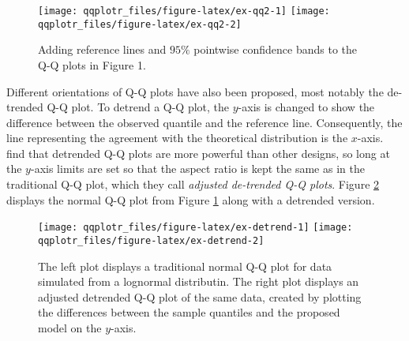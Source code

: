 \begin{Schunk}
\begin{figure}

{\centering \texttt{[image: qqplotr\_files/figure-latex/ex-qq2-1]} \texttt{[image: qqplotr\_files/figure-latex/ex-qq2-2]} 

}

\caption[Adding reference lines and $95\%$ pointwise confidence bands to the Q-Q plots in Figure 1]{Adding reference lines and $95\%$ pointwise confidence bands to the Q-Q plots in Figure 1.}\label{fig:ex-qq2}
\end{figure}
\end{Schunk}

Different orientations of Q-Q plots have also been proposed, most
notably the de-trended Q-Q plot. To detrend a Q-Q plot, the \(y\)-axis
is changed to show the difference between the observed quantile and the
reference line. Consequently, the line representing the agreement with
the theoretical distribution is the \(x\)-axis. \citet{Loy2016-fg} find
that detrended Q-Q plots are more powerful than other designs, so long
at the \(y\)-axis limits are set so that the aspect ratio is kept the
same as in the traditional Q-Q plot, which they call \emph{adjusted
de-trended Q-Q plots}. Figure \ref{fig:ex-detrend} displays the normal
Q-Q plot from Figure \ref{fig:ex-qq2} along with a detrended version.

\begin{Schunk}
\begin{figure}

{\centering \texttt{[image: qqplotr\_files/figure-latex/ex-detrend-1]} \texttt{[image: qqplotr\_files/figure-latex/ex-detrend-2]} 

}

\caption[The left plot displays a traditional normal Q-Q plot for data simulated from a lognormal distributin]{The left plot displays a traditional normal Q-Q plot for data simulated from a lognormal distributin. The right plot displays an adjusted detrended Q-Q plot of the same data, created by plotting the differences between the sample quantiles and the proposed model on the $y$-axis.}\label{fig:ex-detrend}
\end{figure}
\end{Schunk}

